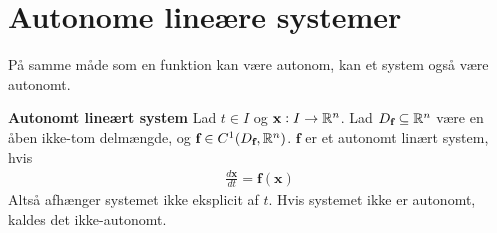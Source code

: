 \section{Autonome lineære systemer}
På samme måde som en funktion kan være autonom, kan et system også være autonomt.

\begin{minipage}\textwidth
\begin{defn}\textbf{Autonomt lineært system} %
\newline
Lad $t \in I$ og $\textbf{x}: I \to \mathbb{R}^n$.
Lad $D_\textbf{f} \subseteq \mathbb{R}^n$ være en åben ikke-tom delmængde, og $\textbf{f}\in C^1(D_\textbf{f},\mathbb{R}^n)$. $\textbf{f}$ er et autonomt linært system, hvis
\begin{align*}
    \frac{d\textbf{x}}{dt} = \textbf{f}(\textbf{x})
\end{align*}
Altså afhænger systemet ikke eksplicit af $t$. Hvis systemet ikke er autonomt, kaldes det ikke-autonomt. 
\end{defn}
\end{minipage}




